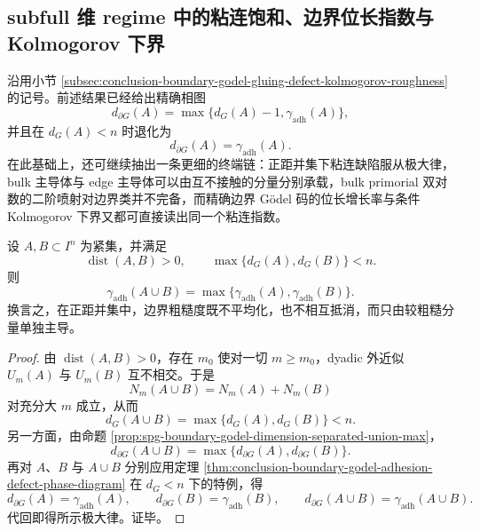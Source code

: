 \subsection{subfull 维 regime 中的粘连饱和、边界位长指数与 Kolmogorov 下界}\label{subsec:conclusion-subfull-boundary-adhesion-storage-kolmogorov}
沿用小节 \ref{subsec:conclusion-boundary-godel-gluing-defect-kolmogorov-roughness} 的记号。前述结果已经给出精确相图
\[
d_{\partial G}(A)=\max\{d_G(A)-1,\gamma_{\mathrm{adh}}(A)\},
\]
并且在 \(d_G(A)<n\) 时退化为
\[
d_{\partial G}(A)=\gamma_{\mathrm{adh}}(A).
\]
在此基础上，还可继续抽出一条更细的终端链：正距并集下粘连缺陷服从极大律，bulk 主导体与 edge 主导体可以由互不接触的分量分别承载，bulk primorial 双对数的二阶喷射对边界类并不完备，而精确边界 Gödel 码的位长增长率与条件 Kolmogorov 下界又都可直接读出同一个粘连指数。

\begin{theorem}[正距并集下的粘连缺陷极大律]\label{thm:conclusion-boundary-godel-separated-union-adhesion-maxlaw}
设 \(A,B\subset I^n\) 为紧集，并满足
\[
\operatorname{dist}(A,B)>0,
\qquad
\max\{d_G(A),d_G(B)\}<n.
\]
则
\[
\gamma_{\mathrm{adh}}(A\cup B)
=
\max\{\gamma_{\mathrm{adh}}(A),\gamma_{\mathrm{adh}}(B)\}.
\]
换言之，在正距并集中，边界粗糙度既不平均化，也不相互抵消，而只由较粗糙分量单独主导。
\end{theorem}
\begin{proof}
由 \(\operatorname{dist}(A,B)>0\)，存在 \(m_0\) 使对一切 \(m\ge m_0\)，dyadic 外近似 \(U_m(A)\) 与 \(U_m(B)\) 互不相交。于是
\[
N_m(A\cup B)=N_m(A)+N_m(B)
\]
对充分大 \(m\) 成立，从而
\[
d_G(A\cup B)=\max\{d_G(A),d_G(B)\}<n.
\]
另一方面，由命题 \ref{prop:spg-boundary-godel-dimension-separated-union-max}，
\[
d_{\partial G}(A\cup B)=\max\{d_{\partial G}(A),d_{\partial G}(B)\}.
\]
再对 \(A\)、\(B\) 与 \(A\cup B\) 分别应用定理 \ref{thm:conclusion-boundary-godel-adhesion-defect-phase-diagram} 在 \(d_G<n\) 下的特例，得
\[
d_{\partial G}(A)=\gamma_{\mathrm{adh}}(A),\qquad
d_{\partial G}(B)=\gamma_{\mathrm{adh}}(B),\qquad
d_{\partial G}(A\cup B)=\gamma_{\mathrm{adh}}(A\cup B).
\]
代回即得所示极大律。证毕。
\end{proof}

